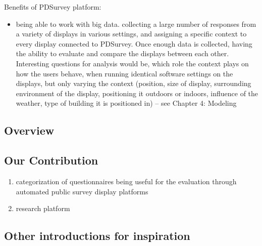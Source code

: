 	Benefits of PDSurvey platform:

	\begin{itemize}
	\item being able to work with big data. collecting a large number of responses from a variety of displays in various settings, and assigning a specific context to every display connected to PDSurvey. Once enough data is collected, having the ability to evaluate and compare the displays between each other. Interesting questions for analysis would be, which role the context plays on how the users behave, when running identical software settings on the displays, but only varying the context (position, size of display, surrounding environment of the display, positioning it outdoors or indoors, influence of the weather, type of building it is positioned in) -- see Chapter 4: Modeling
	\end{itemize}


	\subsection{Overview}



	\subsection{Our Contribution}

	\begin{enumerate}
	\item categorization of questionnaires being useful for the evaluation through automated public survey display platforms
	\item research platform

	\end{enumerate}








	\subsection{Other introductions for inspiration}

